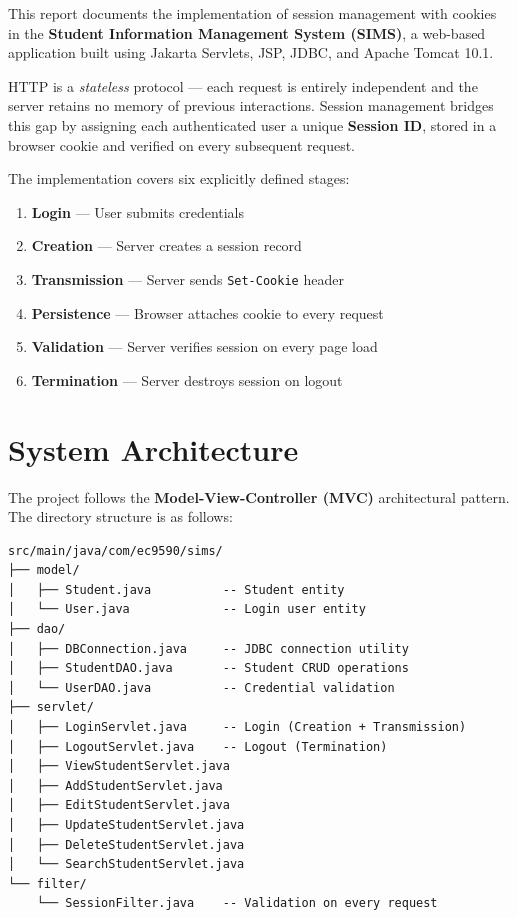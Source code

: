 \documentclass[12pt, a4paper]{article}
\begin{document}
This report documents the implementation of session management with cookies
in the \textbf{Student Information Management System (SIMS)}, a web-based
application built using Jakarta Servlets, JSP, JDBC, and Apache Tomcat 10.1.

HTTP is a \textit{stateless} protocol --- each request is entirely independent
and the server retains no memory of previous interactions. Session management
bridges this gap by assigning each authenticated user a unique \textbf{Session
ID}, stored in a browser cookie and verified on every subsequent request.

The implementation covers six explicitly defined stages:

\begin{enumerate}[leftmargin=2cm]
    \item \textbf{Login} --- User submits credentials
    \item \textbf{Creation} --- Server creates a session record
    \item \textbf{Transmission} --- Server sends \texttt{Set-Cookie} header
    \item \textbf{Persistence} --- Browser attaches cookie to every request
    \item \textbf{Validation} --- Server verifies session on every page load
    \item \textbf{Termination} --- Server destroys session on logout
\end{enumerate}

\section{System Architecture}

The project follows the \textbf{Model-View-Controller (MVC)} architectural
pattern. The directory structure is as follows:

\begin{lstlisting}[style=httpstyle, caption={Project Structure}]
src/main/java/com/ec9590/sims/
├── model/
│   ├── Student.java          -- Student entity
│   └── User.java             -- Login user entity
├── dao/
│   ├── DBConnection.java     -- JDBC connection utility
│   ├── StudentDAO.java       -- Student CRUD operations
│   └── UserDAO.java          -- Credential validation
├── servlet/
│   ├── LoginServlet.java     -- Login (Creation + Transmission)
│   ├── LogoutServlet.java    -- Logout (Termination)
│   ├── ViewStudentServlet.java
│   ├── AddStudentServlet.java
│   ├── EditStudentServlet.java
│   ├── UpdateStudentServlet.java
│   ├── DeleteStudentServlet.java
│   └── SearchStudentServlet.java
└── filter/
    └── SessionFilter.java    -- Validation on every request
\end{lstlisting}
\end{document}
